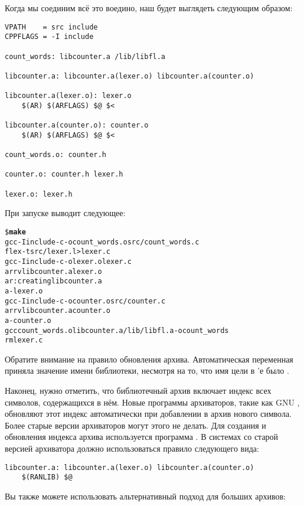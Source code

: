 Когда мы соединим всё это воедино, наш \Makefile{} будет выглядеть
следующим образом:

{\footnotesize
\begin{verbatim}
VPATH    = src include
CPPFLAGS = -I include

count_words: libcounter.a /lib/libfl.a

libcounter.a: libcounter.a(lexer.o) libcounter.a(counter.o)

libcounter.a(lexer.o): lexer.o
    $(AR) $(ARFLAGS) $@ $<

libcounter.a(counter.o): counter.o
    $(AR) $(ARFLAGS) $@ $<

count_words.o: counter.h

counter.o: counter.h lexer.h

lexer.o: lexer.h
\end{verbatim}
}

При запуске \GNUmake{} выводит следующее:

{\footnotesize
\begin{alltt}
\$ \textbf{make}
gcc -I include -c -o count\_words.o src/count\_words.c
flex -t src/lexer.l > lexer.c
gcc -I include -c -o lexer.o lexer.c
ar rv libcounter.a lexer.o
ar: creating libcounter.a
a - lexer.o
gcc -I include -c -o counter.o src/counter.c
ar rv libcounter.a counter.o
a - counter.o
gcc count\_words.o libcounter.a /lib/libfl.a -o count\_words
rm lexer.c
\end{alltt}
}

Обратите внимание на правило обновления архива. Автоматическая
переменная  приняла значение имени библиотеки, несмотря
на то, что имя цели в \Makefile{}'е было
.

Наконец, нужно отметить, что библиотечный архив включает индекс всех
символов, содержащихся в нём. Новые программы архиваторов, такие как
GNU , обновляют этот индекс автоматически при добавлении в
архив нового символа. Более старые версии архиваторов могут этого не
делать. Для создания и обновления индекса архива используется
программа . В системах со старой версией архиватора
должно использоваться правило следующего вида:

{\footnotesize
\begin{verbatim}
libcounter.a: libcounter.a(lexer.o) libcounter.a(counter.o)
    $(RANLIB) $@
\end{verbatim}
}

Вы также можете использовать альтернативный подход для больших
архивов:

